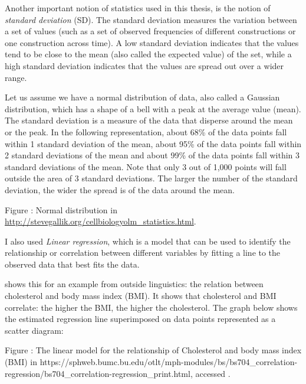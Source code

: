 \documentclass[output=paper]{langscibook}
\begin{document}
  Another important notion of statistics used in this thesis, is the notion of \textit{standard deviation} (SD). The standard deviation measures the variation between a set of values (such as a set of observed frequencies of different constructions or one construction across time). A low standard deviation indicates that the values tend to be close to the mean (also called the expected value) of the set, while a high standard deviation indicates that the values are spread out over a wider range.

  Let us assume we have a normal distribution of data, also called a Gaussian distribution, which has a shape of a bell with a peak at the average value (mean). The standard deviation is a measure of the data that disperse around the mean or the peak. In the following representation, about 68\% of the data points fall within 1 standard deviation of the mean, about 95\% of the data points fall within 2 standard deviations of the mean and about 99\% of the data points fall within 3 standard deviations of the mean. Note that only 3 out of 1,000 points will fall outside the area of 3 standard deviations. The larger the number of the standard deviation, the wider the spread is of the data around the mean. 

\begin{stylecaption}
\textmd{Figure : Normal distribution in} \url{http://stevegallik.org/cellbiologyolm_statistics.html}{\textmd{.}}
\end{stylecaption}

I also used \textit{Linear regression}, which is a model that can be used to identify the relationship or correlation between different variables by fitting a line to the observed data that best fits the data. 

   shows this for an example from outside linguistics: the relation between cholesterol and body mass index (BMI). It shows that cholesterol and BMI correlate: the higher the BMI, the higher the cholesterol. The graph below shows the estimated regression line superimposed on data points represented as a scatter diagram:

\begin{stylecaption}
\textmd{Figure : The linear model for the relationship of Cholesterol and body mass index (BMI) in https://sphweb.bumc.bu.edu/otlt/mph-modules/bs/bs704\_correlation-regression/bs704\_correlation-regression\_print.html, accessed \citealt{November2020}.}
\end{stylecaption}
\end{document}
